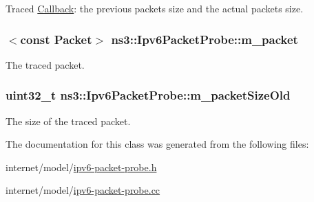 Traced \hyperlink{classns3_1_1Callback}{Callback}\+: the previous packet\textquotesingle{}s size and the actual packet\textquotesingle{}s size. 

\subsubsection[{\texorpdfstring{m\+\_\+packet}{m_packet}}]{$<$const {\bf Packet}$>$ ns3\+::\+Ipv6\+Packet\+Probe\+::m\+\_\+packet\hspace{0.3cm}{\ttfamily [private]}}\hypertarget{classns3_1_1Ipv6PacketProbe_a5e37df4c8dd1ec07133d9ad5954057a4}{}\label{classns3_1_1Ipv6PacketProbe_a5e37df4c8dd1ec07133d9ad5954057a4}


The traced packet. 

\subsubsection[{\texorpdfstring{m\+\_\+packet\+Size\+Old}{m_packetSizeOld}}]{\setlength{\rightskip}{0pt plus 5cm}uint32\+\_\+t ns3\+::\+Ipv6\+Packet\+Probe\+::m\+\_\+packet\+Size\+Old\hspace{0.3cm}{\ttfamily [private]}}\hypertarget{classns3_1_1Ipv6PacketProbe_a9b6d7c8faebfcf1c9d8ea70712fcd3a8}{}\label{classns3_1_1Ipv6PacketProbe_a9b6d7c8faebfcf1c9d8ea70712fcd3a8}


The size of the traced packet. 



The documentation for this class was generated from the following files\+:\begin{DoxyCompactItemize}
\item 
internet/model/\hyperlink{ipv6-packet-probe_8h}{ipv6-\/packet-\/probe.\+h}\item 
internet/model/\hyperlink{ipv6-packet-probe_8cc}{ipv6-\/packet-\/probe.\+cc}\end{DoxyCompactItemize}
